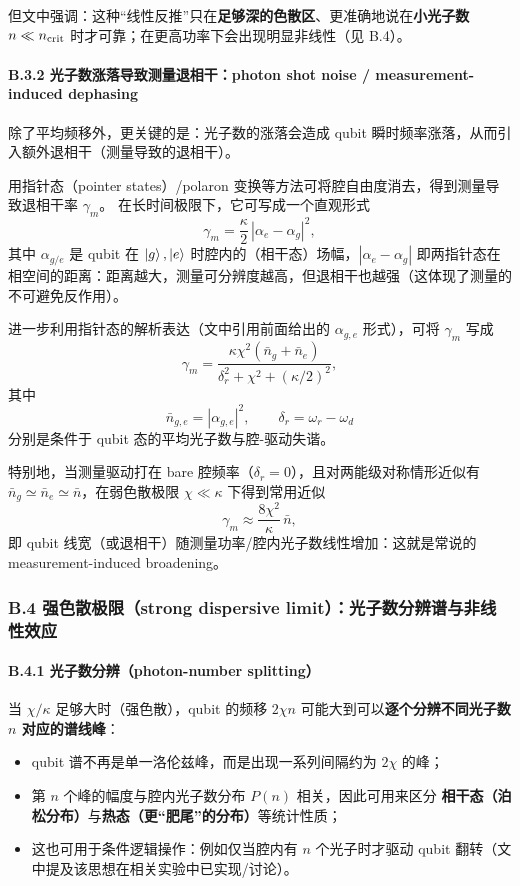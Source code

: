 \documentclass[12pt,a4paper,oneside]{ctexbook}
\let\oldparagraph\paragraph
\renewcommand{\paragraph}[1]{\oldparagraph{#1}\mbox{}}
\begin{document}
但文中强调：这种“线性反推”只在\textbf{足够深的色散区}、更准确地说在\textbf{小光子数 $n\ll n_{\rm crit}$} 时才可靠；在更高功率下会出现明显非线性（见 B.4）。

\paragraph{B.3.2 光子数涨落导致测量退相干：photon shot noise / measurement-induced dephasing}
除了平均频移外，更关键的是：光子数的涨落会造成 qubit 瞬时频率涨落，从而引入额外退相干（测量导致的退相干）。

用指针态（pointer states）/polaron 变换等方法可将腔自由度消去，得到测量导致退相干率 $\gamma_m$。
在长时间极限下，它可写成一个直观形式
\[
\gamma_m = \frac{\kappa}{2}\,|\alpha_e-\alpha_g|^2,
\]
其中 $\alpha_{g/e}$ 是 qubit 在 $\ket{g},\ket{e}$ 时腔内的（相干态）场幅，$|\alpha_e-\alpha_g|$ 即两指针态在相空间的距离：距离越大，测量可分辨度越高，但退相干也越强（这体现了测量的不可避免反作用）。

进一步利用指针态的解析表达（文中引用前面给出的 $\alpha_{g,e}$ 形式），可将 $\gamma_m$ 写成
\begin{equation}
\gamma_m
=
\frac{\kappa \chi^2(\bar n_g+\bar n_e)}{
\delta_r^2+\chi^2+(\kappa/2)^2},
\tag{128}
\end{equation}
其中
\[
\bar n_{g,e}=|\alpha_{g,e}|^2,\qquad
\delta_r=\omega_r-\omega_d
\]
分别是条件于 qubit 态的平均光子数与腔-驱动失谐。

特别地，当测量驱动打在 bare 腔频率（$\delta_r=0$），且对两能级对称情形近似有 $\bar n_g\simeq \bar n_e\simeq \bar n$，在弱色散极限 $\chi\ll\kappa$ 下得到常用近似
\[
\gamma_m \approx \frac{8\chi^2}{\kappa}\,\bar n,
\]
即 qubit 线宽（或退相干）随测量功率/腔内光子数线性增加：这就是常说的 measurement-induced broadening。

\subsubsection{B.4 强色散极限（strong dispersive limit）：光子数分辨谱与非线性效应}

\paragraph{B.4.1 光子数分辨（photon-number splitting）}
当 $\chi/\kappa$ 足够大时（强色散），qubit 的频移 $2\chi n$ 可能大到可以\textbf{逐个分辨不同光子数 $n$ 对应的谱线峰}：
\begin{itemize}
  \item qubit 谱不再是单一洛伦兹峰，而是出现一系列间隔约为 $2\chi$ 的峰；
  \item 第 $n$ 个峰的幅度与腔内光子数分布 $P(n)$ 相关，因此可用来区分
  \textbf{相干态（泊松分布）}与\textbf{热态（更“肥尾”的分布）}等统计性质；
  \item 这也可用于条件逻辑操作：例如仅当腔内有 $n$ 个光子时才驱动 qubit 翻转（文中提及该思想在相关实验中已实现/讨论）。
\end{itemize}
\end{document}
